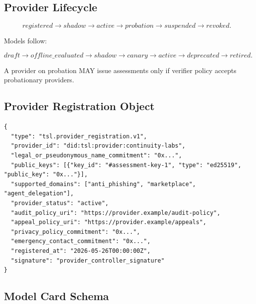 \documentclass[11pt]{article}
\begin{document}
\subsection{Provider Lifecycle}

\begin{equation}
registered \rightarrow shadow \rightarrow active \rightarrow probation \rightarrow suspended \rightarrow revoked.
\end{equation}

Models follow:

\begin{equation}
draft \rightarrow offline\_evaluated \rightarrow shadow \rightarrow canary \rightarrow active \rightarrow deprecated \rightarrow retired.
\end{equation}

A provider on probation MAY issue assessments only if verifier policy accepts probationary providers.

\subsection{Provider Registration Object}

\begin{lstlisting}[style=tslcode]
{
  "type": "tsl.provider_registration.v1",
  "provider_id": "did:tsl:provider:continuity-labs",
  "legal_or_pseudonymous_name_commitment": "0x...",
  "public_keys": [{"key_id": "#assessment-key-1", "type": "ed25519", "public_key": "0x..."}],
  "supported_domains": ["anti_phishing", "marketplace", "agent_delegation"],
  "provider_status": "active",
  "audit_policy_uri": "https://provider.example/audit-policy",
  "appeal_policy_uri": "https://provider.example/appeals",
  "privacy_policy_commitment": "0x...",
  "emergency_contact_commitment": "0x...",
  "registered_at": "2026-05-26T00:00:00Z",
  "signature": "provider_controller_signature"
}
\end{lstlisting}

\subsection{Model Card Schema}
\end{document}
